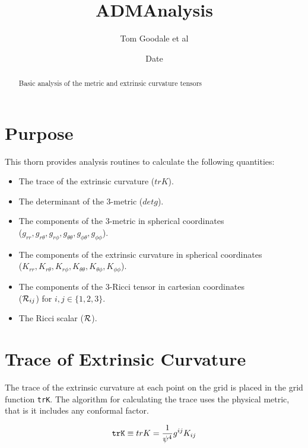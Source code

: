 \documentclass{article}
\begin{document}
\title{ADMAnalysis}
\author{Tom Goodale et al}
\date{$ $Date$ $}

\maketitle


\begin{abstract}
Basic analysis of the metric and extrinsic curvature tensors
\end{abstract}

\section{Purpose}

This thorn provides analysis routines to calculate the following quantities:

\begin{itemize}
\item
The trace of the extrinsic curvature ($trK$).
\item
The determinant of the 3-metric ($detg$).
\item
The components of the 3-metric in spherical coordinates \\
($g_{rr},g_{r\theta},g_{r\phi},g_{\theta\theta},g_{\phi\theta},g_{\phi\phi}$).
\item
The components of the extrinsic curvature in spherical coordinates \\
($K_{rr},K_{r\theta},K_{r\phi},K_{\theta\theta},K_{\theta\phi},K_{\phi\phi}$).
\item The components of the 3-Ricci tensor in cartesian coordinates \\
(${\cal R}_{ij}$) for $i,j \in \{1,2,3\}$.
\item The Ricci scalar (${\cal R}$).
\end{itemize}

\section{Trace of Extrinsic Curvature}

The trace of the extrinsic curvature at each point on the grid is placed in
the grid function {\tt trK}. The algorithm for calculating the trace 
uses the physical metric, that is it includes any conformal factor.

\begin{equation}
{\tt trK} \equiv tr K = \frac{1}{\psi^4} g^{ij} K_{ij}
\end{equation}
\end{document}
